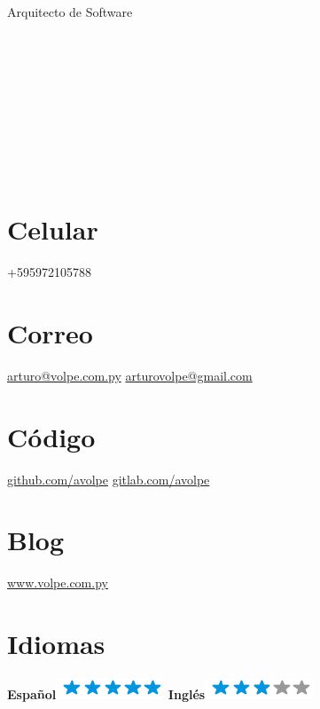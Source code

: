 \documentclass[]{friggeri-cv}
\begin{document}
{Arquitecto de Software}


\begin{aside}
	\section{}~
    \section{}~
    \section{}~
    \section{Celular}
        +595972105788
        ~
    \section{Correo}
        \href{mailto:arturo@volpe.com.py}{arturo@volpe.com.py}
        \href{mailto:arturovolpe@gmail.com}{arturovolpe@gmail.com}
        ~
    \section{Código}
        \href{https://github.com/avolpe}{github.com/avolpe}
        \href{https://gitlab.com/avolpe}{gitlab.com/avolpe}
        ~
    \section{Blog}
        \href{https://www.volpe.com.py}{www.volpe.com.py}
        ~
\section{Idiomas}
\textbf{Español}\includegraphics[scale=0.40]{img/5stars.png}
\textbf{Inglés}\includegraphics[scale=0.40]{img/3stars.png}
\end{aside}
\end{document}
